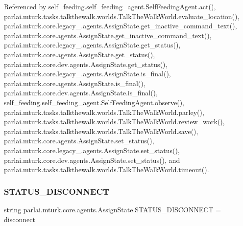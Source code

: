 Referenced by self\+\_\+feeding.\+self\+\_\+feeding\+\_\+agent.\+Self\+Feeding\+Agent.\+act(), parlai.\+mturk.\+tasks.\+talkthewalk.\+worlds.\+Talk\+The\+Walk\+World.\+evaluate\+\_\+location(), parlai.\+mturk.\+core.\+legacy\+\_.\+agents.\+Assign\+State.\+get\+\_\+inactive\+\_\+command\+\_\+text(), parlai.\+mturk.\+core.\+agents.\+Assign\+State.\+get\+\_\+inactive\+\_\+command\+\_\+text(), parlai.\+mturk.\+core.\+legacy\+\_.\+agents.\+Assign\+State.\+get\+\_\+status(), parlai.\+mturk.\+core.\+agents.\+Assign\+State.\+get\+\_\+status(), parlai.\+mturk.\+core.\+dev.\+agents.\+Assign\+State.\+get\+\_\+status(), parlai.\+mturk.\+core.\+legacy\+\_.\+agents.\+Assign\+State.\+is\+\_\+final(), parlai.\+mturk.\+core.\+agents.\+Assign\+State.\+is\+\_\+final(), parlai.\+mturk.\+core.\+dev.\+agents.\+Assign\+State.\+is\+\_\+final(), self\+\_\+feeding.\+self\+\_\+feeding\+\_\+agent.\+Self\+Feeding\+Agent.\+observe(), parlai.\+mturk.\+tasks.\+talkthewalk.\+worlds.\+Talk\+The\+Walk\+World.\+parley(), parlai.\+mturk.\+tasks.\+talkthewalk.\+worlds.\+Talk\+The\+Walk\+World.\+review\+\_\+work(), parlai.\+mturk.\+tasks.\+talkthewalk.\+worlds.\+Talk\+The\+Walk\+World.\+save(), parlai.\+mturk.\+core.\+agents.\+Assign\+State.\+set\+\_\+status(), parlai.\+mturk.\+core.\+legacy\+\_.\+agents.\+Assign\+State.\+set\+\_\+status(), parlai.\+mturk.\+core.\+dev.\+agents.\+Assign\+State.\+set\+\_\+status(), and parlai.\+mturk.\+tasks.\+talkthewalk.\+worlds.\+Talk\+The\+Walk\+World.\+timeout().

\mbox{\label{classparlai_1_1mturk_1_1core_1_1agents_1_1AssignState_a7a16ee88b20628d6080afa2b879a3304}} 
\subsubsection{\texorpdfstring{S\+T\+A\+T\+U\+S\+\_\+\+D\+I\+S\+C\+O\+N\+N\+E\+CT}{STATUS\_DISCONNECT}}
{\footnotesize\ttfamily string parlai.\+mturk.\+core.\+agents.\+Assign\+State.\+S\+T\+A\+T\+U\+S\+\_\+\+D\+I\+S\+C\+O\+N\+N\+E\+CT = \textquotesingle{}disconnect\textquotesingle{}\hspace{0.3cm}{\ttfamily [static]}}



